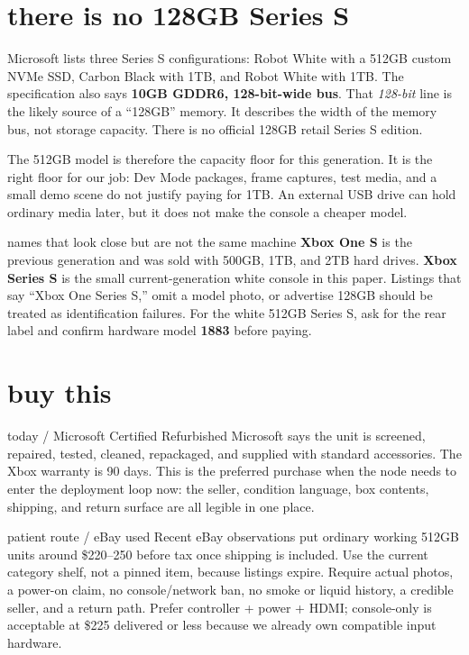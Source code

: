 \documentclass[10pt,letterpaper]{article}
\begin{document}
\section{there is no 128GB Series S}

\begin{gearwarning}
Microsoft lists three Series S configurations: Robot White with a 512GB custom
NVMe SSD, Carbon Black with 1TB, and Robot White with 1TB. The specification
also says \textbf{10GB GDDR6, 128-bit-wide bus}. That \emph{128-bit} line is the
likely source of a ``128GB'' memory. It describes the width of the memory bus,
not storage capacity. There is no official 128GB retail Series S edition.
\end{gearwarning}

The 512GB model is therefore the capacity floor for this generation. It is the
right floor for our job: Dev Mode packages, frame captures, test media, and a
small demo scene do not justify paying for 1TB. An external USB drive can hold
ordinary media later, but it does not make the console a cheaper model.

\begin{gearcard}{names that look close but are not the same machine}
\textbf{Xbox One S} is the previous generation and was sold with 500GB, 1TB,
and 2TB hard drives. \textbf{Xbox Series S} is the small current-generation
white console in this paper. Listings that say ``Xbox One Series S,'' omit a
model photo, or advertise 128GB should be treated as identification failures.
For the white 512GB Series S, ask for the rear label and confirm hardware model
\textbf{1883} before paying.
\end{gearcard}

\section{buy this}

\begin{gearcard}{today / Microsoft Certified Refurbished}
Microsoft says the unit is screened, repaired, tested, cleaned, repackaged,
and supplied with standard accessories. The Xbox warranty is 90 days. This is
the preferred purchase when the node needs to enter the deployment loop now:
the seller, condition language, box contents, shipping, and return surface are
all legible in one place.
\end{gearcard}

\begin{gearcard}{patient route / eBay used}
Recent eBay observations put ordinary working 512GB units around \$220--250
before tax once shipping is included. Use the current category shelf, not a
pinned item, because listings expire. Require actual photos, a power-on claim,
no console/network ban, no smoke or liquid history, a credible seller, and a
return path. Prefer controller + power + HDMI; console-only is acceptable at
\$225 delivered or less because we already own compatible input hardware.
\end{gearcard}
\end{document}
